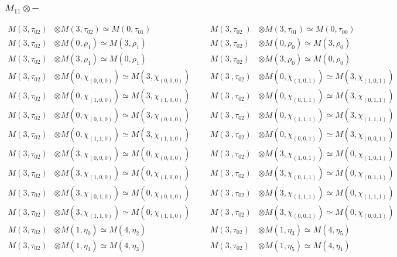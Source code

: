 \subsubsection{$M_11\otimes -$}
\begin{align*}
M(3,\tau_{02}) &\otimes M(3,\tau_{02}) \simeq M(0,\tau_{01}) &&& M(3,\tau_{02}\
) &\otimes M(3,\tau_{01}) \simeq M(0,\tau_{00})\\
M(3,\tau_{02}) &\otimes M(0,\rho_{1}) \simeq M(3,\rho_{1}) &&& M(3,\tau_{02}) \
&\otimes M(0,\rho_{0}) \simeq M(3,\rho_{0})\\
M(3,\tau_{02}) &\otimes M(3,\rho_{1}) \simeq M(0,\rho_{1}) &&& M(3,\tau_{02}) \
&\otimes M(3,\rho_{0}) \simeq M(0,\rho_{0})\\
M(3,\tau_{02}) &\otimes M(0,\chi_{(0,0,0)}) \simeq M(3,\chi_{(0,0,0)}) &&& M(3\
,\tau_{02}) &\otimes M(0,\chi_{(1,0,1)}) \simeq M(3,\chi_{(1,0,1)})\\
M(3,\tau_{02}) &\otimes M(0,\chi_{(1,0,0)}) \simeq M(3,\chi_{(1,0,0)}) &&& M(3\
,\tau_{02}) &\otimes M(0,\chi_{(0,1,1)}) \simeq M(3,\chi_{(0,1,1)})\\
M(3,\tau_{02}) &\otimes M(0,\chi_{(0,1,0)}) \simeq M(3,\chi_{(0,1,0)}) &&& M(3\
,\tau_{02}) &\otimes M(0,\chi_{(1,1,1)}) \simeq M(3,\chi_{(1,1,1)})\\
M(3,\tau_{02}) &\otimes M(0,\chi_{(1,1,0)}) \simeq M(3,\chi_{(1,1,0)}) &&& M(3\
,\tau_{02}) &\otimes M(0,\chi_{(0,0,1)}) \simeq M(3,\chi_{(0,0,1)})\\
M(3,\tau_{02}) &\otimes M(3,\chi_{(0,0,0)}) \simeq M(0,\chi_{(0,0,0)}) &&& M(3\
,\tau_{02}) &\otimes M(3,\chi_{(1,0,1)}) \simeq M(0,\chi_{(1,0,1)})\\
M(3,\tau_{02}) &\otimes M(3,\chi_{(1,0,0)}) \simeq M(0,\chi_{(1,0,0)}) &&& M(3\
,\tau_{02}) &\otimes M(3,\chi_{(0,1,1)}) \simeq M(0,\chi_{(0,1,1)})\\
M(3,\tau_{02}) &\otimes M(3,\chi_{(0,1,0)}) \simeq M(0,\chi_{(0,1,0)}) &&& M(3\
,\tau_{02}) &\otimes M(3,\chi_{(1,1,1)}) \simeq M(0,\chi_{(1,1,1)})\\
M(3,\tau_{02}) &\otimes M(3,\chi_{(1,1,0)}) \simeq M(0,\chi_{(1,1,0)}) &&& M(3\
,\tau_{02}) &\otimes M(3,\chi_{(0,0,1)}) \simeq M(0,\chi_{(0,0,1)})\\
M(3,\tau_{02}) &\otimes M(1,\eta_{0}) \simeq M(4,\eta_{2}) &&& M(3,\tau_{02}) \
&\otimes M(1,\eta_{3}) \simeq M(4,\eta_{5})\\
M(3,\tau_{02}) &\otimes M(1,\eta_{1}) \simeq M(4,\eta_{3}) &&& M(3,\tau_{02}) \
&\otimes M(1,\eta_{5}) \simeq M(4,\eta_{1})\\

\end{align*}
